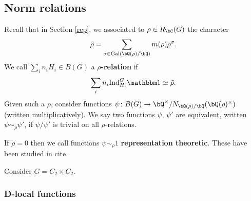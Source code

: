 \subsection{Norm relations}

Recall that in Section \ref{rep}, we associated to $\rho \in R_{\bC}(G)$ the character
    \[ \tilde{\rho} = \sum_{\sigma \in \Gal(\bQ(\rho) / \bQ)} m(\rho) \rho^{\sigma} .\]
 We call $\sum_i n_i H_i \in B(G)$ a \textbf{$\rho$-relation} if 
    \[ \sum_i n_i \Ind_{H_i}^G \trivial \simeq \tilde{\rho}. \]
Given such a $\rho$, consider functions $\psi \colon B(G) \to \bQ^{\times} / N_{\bQ(\rho) / \bQ}(\bQ(\rho)^\times)$ (written multiplicatively). We say two functions $\psi$, $\psi'$ are equivalent, written $\psi \sim_{\rho} \psi'$, if $\psi / \psi'$ is trivial on all $\rho$-relations. 

\begin{rem}
    If $\rho = 0$ then we call functions $\psi \sim_{\rho} 1$ \textbf{representation theoretic}. These have been studied in {\color{red} cite}.
\end{rem}


\begin{example}
    Consider $G = C_2 \times C_2$.
\end{example}
\subsubsection{D-local functions}





